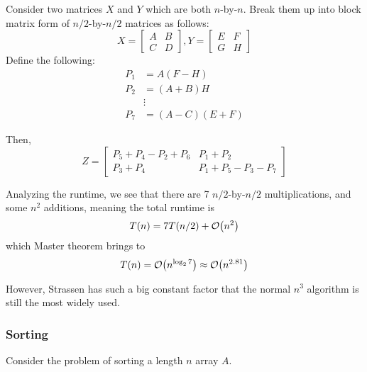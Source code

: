 \begin{algothm} 
    Consider two matrices $X$ and $Y$ which are both $n$-by-$n$.
    Break them up into block matrix form of $n/2$-by-$n/2$ matrices as follows:
    \[ X = 
    \begin{bmatrix}
    A & B \\
    C & D
    \end{bmatrix}, Y = \begin{bmatrix}
    E & F \\
    G & H 
    \end{bmatrix} \]
    Define the following:
    \begin{align*}
        P_1 &= A(F - H) \\
        P_2 &= (A + B)H \\
        &\vdots \\
        P_7 &= (A - C)(E + F)
    \end{align*}

    Then,
    \[ Z = \begin{bmatrix}
       P_5 + P_4 - P_2 + P_6 & P_1 + P_2 \\
       P_3 + P_4 & P_1 + P_5 - P_3 - P_7
    \end{bmatrix} \]

    Analyzing the runtime, we see that there are 7 $n/2$-by-$n/2$ multiplications, and some $n^2$ additions,
    meaning the total runtime is
    \[ T(n) = 7 T(n/2) + \mathcal{O}\qty(n^2) \]
    which Master theorem brings to
    \[ T(n) = \mathcal{O}\qty(n^{\log_2{7}}) \approx \mathcal{O}\qty(n^{2.81}) \]
\end{algothm}

However, Strassen has such a big constant factor that the normal $n^3$ algorithm
is still the most widely used.

\subsubsection{Sorting}
    Consider the problem of sorting a length $n$ array $A$. 

